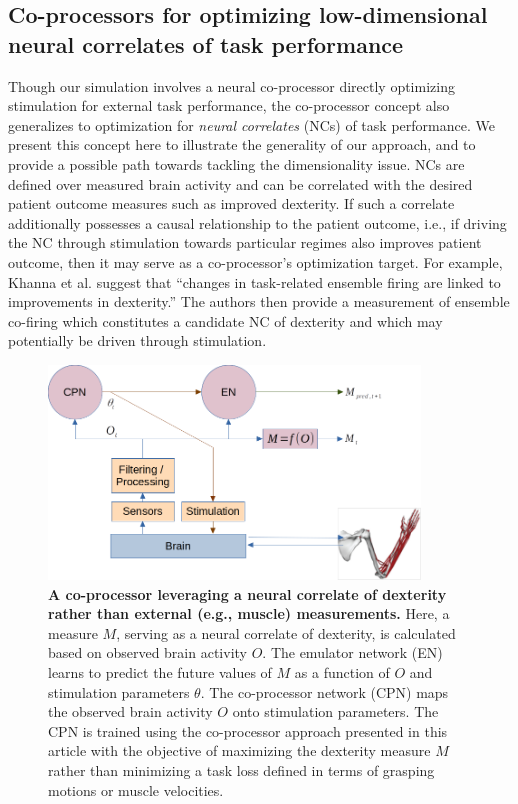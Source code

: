 \documentclass[12pt]{iopart}
\begin{document}
\subsection{Co-processors for optimizing low-dimensional neural correlates of task performance}
Though our simulation involves a neural co-processor directly optimizing stimulation for
external task performance, the co-processor concept also generalizes to optimization for
\textit{neural correlates} (NCs) of task performance. We present this concept here to illustrate
the generality of our approach, and to provide a possible path towards tackling the dimensionality issue.
NCs are defined over measured brain activity and can be correlated with the desired patient outcome measures
such as improved dexterity. If such a correlate additionally possesses a causal relationship to the patient
outcome, i.e., if driving the NC through stimulation towards particular regimes also improves patient outcome,
then it may serve as a co-processor's optimization target. For example, Khanna et al. \cite{khanna.openloop}
suggest that ``changes in task-related ensemble firing are linked to improvements in dexterity.''
The authors then provide a measurement of ensemble co-firing which constitutes a candidate NC of dexterity
and which may potentially be driven through stimulation.

\begin{figure}[h]
	\centering
	\includegraphics[width=0.88\textwidth]{cofiring_model.png}
	\caption{\textbf{A co-processor leveraging a neural correlate of dexterity rather
    than external (e.g., muscle) measurements.} Here, a measure $M$, serving as a neural correlate of
    dexterity, is calculated based on observed brain activity $O$. The emulator network (EN) learns
    to predict the future values of $M$ as a function of $O$ and stimulation parameters
     $\theta$. The co-processor network (CPN) maps the observed brain activity $O$ onto stimulation
    parameters. The CPN is trained using the co-processor approach presented in this article with the
    objective of maximizing the dexterity measure $M$ rather than minimizing a task loss defined in terms
    of grasping motions or muscle velocities.}
	\label{fig:correlate}
\end{figure}
\end{document}
